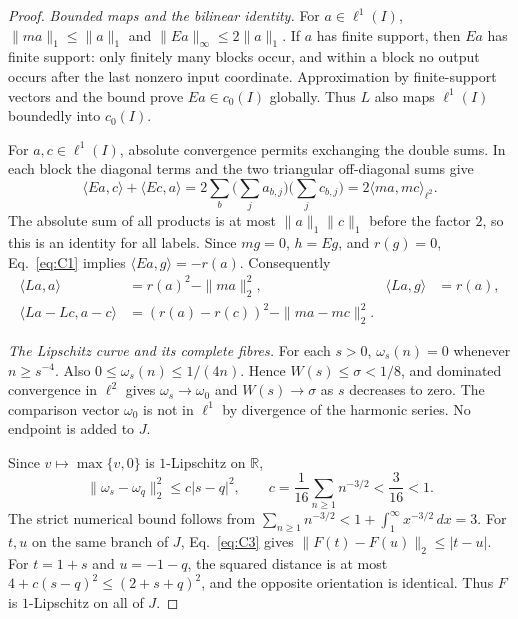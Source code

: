 \documentclass[11pt]{article}
\newcommand{\R}{\mathbb R}
\newcommand{\pair}[2]{\langle #1,#2\rangle}
\begin{document}
\begin{proof}
\noindent\textit{Bounded maps and the bilinear identity.}
\label{sec:C1}
For $a\in\ell^1(I)$, $\|ma\|_1\le\|a\|_1$ and
$\|Ea\|_\infty\le2\|a\|_1$. If $a$ has finite support, then $Ea$ has
finite support: only finitely many blocks occur, and within a block no
output occurs after the last nonzero input coordinate. Approximation by
finite-support vectors and the bound prove $Ea\in c_0(I)$ globally.
Thus $L$ also maps $\ell^1(I)$ boundedly into $c_0(I)$.

For $a,c\in\ell^1(I)$, absolute convergence permits exchanging the double
sums. In each block the diagonal terms and the two triangular
off-diagonal sums give
\begin{equation}
\pair{Ea}{c}+\pair{Ec}{a}
 =2\sum_b\Big(\sum_j a_{b,j}\Big)\Big(\sum_j c_{b,j}\Big)
 =2\pair{ma}{mc}_{\ell^2}.
\tag{C1}\label{eq:C1}
\end{equation}
The absolute sum of all products is at most $\|a\|_1\|c\|_1$ before the
factor $2$, so this is an identity for all labels. Since $mg=0$, $h=Eg$,
and $r(g)=0$, Eq.~\eqref{eq:C1} implies $\pair{Ea}{g}=-r(a)$.
Consequently
\begin{equation}
\begin{aligned}
\pair{La}{a}&=r(a)^2-\|ma\|_2^2,&
\pair{La}{g}&=r(a),\\
\pair{La-Lc}{a-c}&=(r(a)-r(c))^2-\|ma-mc\|_2^2.
\end{aligned}
\tag{C2}\label{eq:C2}
\end{equation}

\noindent\textit{The Lipschitz curve and its complete fibres.}
\label{sec:C2}
For each $s>0$, $\omega_s(n)=0$ whenever $n\ge s^{-4}$. Also
$0\le\omega_s(n)\le1/(4n)$. Hence $W(s)\le\sigma<1/8$, and dominated
convergence in $\ell^2$ gives $\omega_s\to\omega_0$ and $W(s)\to\sigma$
as $s$ decreases to zero. The comparison vector $\omega_0$ is not in
$\ell^1$ by divergence of the harmonic series. No endpoint is added to $J$.

Since $v\mapsto\max\{v,0\}$ is $1$-Lipschitz on $\R$,
\begin{equation}
\|\omega_s-\omega_q\|_2^2\le c|s-q|^2,\qquad
c=\frac1{16}\sum_{n\ge1}n^{-3/2}<\frac3{16}<1.
\tag{C3}\label{eq:C3}
\end{equation}
The strict numerical bound follows from
$\sum_{n\ge1}n^{-3/2}<1+\int_1^\infty x^{-3/2}\,dx=3$.
For $t,u$ on the same branch of $J$, Eq.~\eqref{eq:C3} gives
$\|F(t)-F(u)\|_2\le|t-u|$. For $t=1+s$ and $u=-1-q$, the squared
distance is at most $4+c(s-q)^2\le(2+s+q)^2$, and the opposite
orientation is identical. Thus $F$ is $1$-Lipschitz on all of $J$.


\end{proof}
\end{document}
